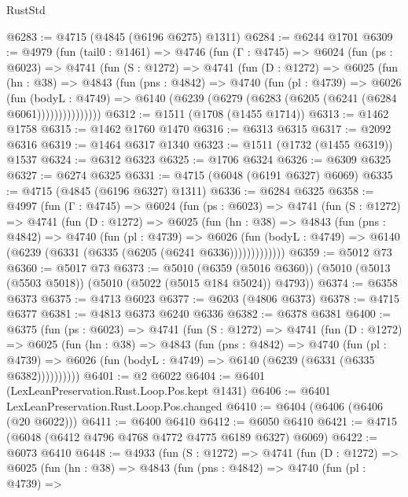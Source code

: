 \begin{lexlean}{RustStd}
\begin{coremodule}
@6283 := @4715 (@4845 (@6196 @6275) @1311)
@6284 := @6244 @1701
@6309 := @4979
    (fun (tail0 : @1461) =>
    @4746
      (fun (Γ : @4745) =>
      @6024
        (fun (ps : @6023) =>
        @4741
          (fun (S : @1272) =>
          @4741
            (fun (D : @1272) =>
            @6025
              (fun (hn : @38) =>
              @4843
                (fun (pns : @4842) =>
                @4740
                  (fun (pl : @4739) =>
                  @6026
                    (fun (bodyL : @4749) =>
                    @6140 (@6239 (@6279 (@6283 (@6205 (@6241 (@6284 @6061)))))))))))))))
@6312 := @1511 (@1708 (@1455 @1714))
@6313 := @1462 @1758
@6315 := @1462 @1760 @1470
@6316 := @6313 @6315
@6317 := @2092 @6316
@6319 := @1464 @6317 @1340
@6323 := @1511 (@1732 (@1455 @6319)) @1537
@6324 := @6312 @6323
@6325 := @1706 @6324
@6326 := @6309 @6325
@6327 := @6274 @6325
@6331 := @4715 (@6048 (@6191 @6327) @6069)
@6335 := @4715 (@4845 (@6196 @6327) @1311)
@6336 := @6284 @6325
@6358 := @4997
    (fun (Γ : @4745) =>
    @6024
      (fun (ps : @6023) =>
      @4741
        (fun (S : @1272) =>
        @4741
          (fun (D : @1272) =>
          @6025
            (fun (hn : @38) =>
            @4843
              (fun (pns : @4842) =>
              @4740
                (fun (pl : @4739) =>
                @6026
                  (fun (bodyL : @4749) =>
                  @6140 (@6239 (@6331 (@6335 (@6205 (@6241 @6336)))))))))))))
@6359 := @5012 @73
@6360 := @5017 @73
@6373 := @5010
    (@6359 (@5016 @6360))
    (@5010 (@5013 (@5503 @5018)) (@5010 (@5022 (@5015 @184 @5024)) @4793))
@6374 := @6358 @6373
@6375 := @4713 @6023
@6377 := @6203 (@4806 @6373)
@6378 := @4715 @6377
@6381 := @4813 @6373 @6240 @6336
@6382 := @6378 @6381
@6400 := @6375
    (fun (ps : @6023) =>
    @4741
      (fun (S : @1272) =>
      @4741
        (fun (D : @1272) =>
        @6025
          (fun (hn : @38) =>
          @4843
            (fun (pns : @4842) =>
            @4740
              (fun (pl : @4739) =>
              @6026 (fun (bodyL : @4749) => @6140 (@6239 (@6331 (@6335 @6382))))))))))
@6401 := @2 @6022
@6404 := @6401 (LexLeanPreservation.Rust.Loop.Pos.kept @1431)
@6406 := @6401 LexLeanPreservation.Rust.Loop.Pos.changed
@6410 := @6404 (@6406 (@6406 (@20 @6022)))
@6411 := @6400 @6410
@6412 := @6050 @6410
@6421 := @4715 (@6048 (@6412 @4796 @4768 @4772 @4775 @6189 @6327) @6069)
@6422 := @6073 @6410
@6448 := @4933
    (fun (S : @1272) =>
    @4741
      (fun (D : @1272) =>
      @6025
        (fun (hn : @38) =>
        @4843
          (fun (pns : @4842) =>
          @4740
            (fun (pl : @4739) =>

\end{coremodule}
\end{lexlean}
